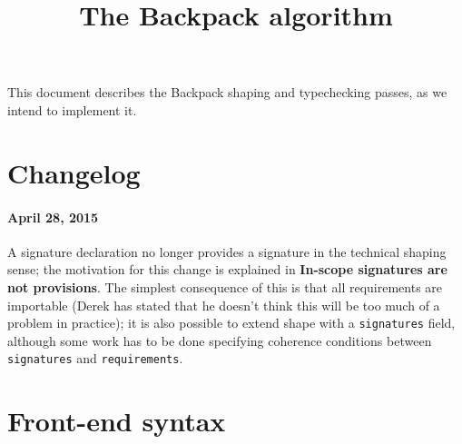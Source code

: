 \documentclass{article}
\title{The Backpack algorithm}
\begin{document}
\maketitle

This document describes the Backpack shaping and typechecking
passes, as we intend to implement it.

\section{Changelog}

\paragraph{April 28, 2015}  A signature declaration no longer provides
a signature in the technical shaping sense; the motivation for this change
is explained in \textbf{In-scope signatures are not provisions}.  The simplest
consequence of this is that all requirements are importable (Derek has stated that he doesn't
think this will be too much of a problem in practice); it is also possible to
extend shape with a \verb|signatures| field, although some work has to be
done specifying coherence conditions between \verb|signatures| and \verb|requirements|.

\section{Front-end syntax}
\end{document}
